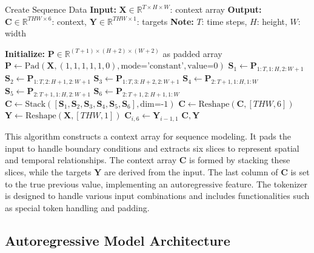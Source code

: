 \documentclass[10pt,a4paper]{article}
\begin{document}
\begin{algorithm}[ht]
\small  %
\caption{Create Sequence Data
\newline
\textbf{Input:} $\mathbf{X} \in \mathbb{R}^{T \times H \times W}$: context array
\newline
\textbf{Output:} $\mathbf{C} \in \mathbb{R}^{THW \times 6}$: context, $\mathbf{Y} \in \mathbb{R}^{THW \times 1}$: targets
\newline
\textbf{Note:} $T$: time steps, $H$: height, $W$: width
}
\begin{algorithmic}[0]
\State \textbf{Initialize:} $\mathbf{P} \in \mathbb{R}^{(T+1) \times (H+2) \times (W+2)}$ as padded array
    \State $\mathbf{P} \gets \text{Pad}(\mathbf{X}, (1,1,1,1,1,0), \text{mode='constant'}, \text{value=0})$
    \State $\mathbf{S}_1 \gets \mathbf{P}_{1:T, 1:H, 2:W+1}$
    \State $\mathbf{S}_2 \gets \mathbf{P}_{1:T, 2:H+1, 2:W+1}$
    \State $\mathbf{S}_3 \gets \mathbf{P}_{1:T, 3:H+2, 2:W+1}$
    \State $\mathbf{S}_4 \gets \mathbf{P}_{2:T+1, 1:H, 1:W}$
    \State $\mathbf{S}_5 \gets \mathbf{P}_{2:T+1, 1:H, 2:W+1}$
    \State $\mathbf{S}_6 \gets \mathbf{P}_{2:T+1, 2:H+1, 1:W}$
    \State $\mathbf{C} \gets \text{Stack}([\mathbf{S}_1, \mathbf{S}_2, \mathbf{S}_3, \mathbf{S}_4, \mathbf{S}_5, \mathbf{S}_6], \text{dim=-1})$
    \State $\mathbf{C} \gets \text{Reshape}(\mathbf{C}, [THW, 6])$
    \State $\mathbf{Y} \gets \text{Reshape}(\mathbf{X}, [THW, 1])$
        \State $\mathbf{C}_{i,6} \gets \mathbf{Y}_{i-1,1}$
    \EndFor
    \State \Return $\mathbf{C}, \mathbf{Y}$
\EndFunction
\end{algorithmic}
\end{algorithm}

This algorithm constructs a context array for sequence modeling. It pads the input to handle boundary conditions and extracts six slices to represent spatial and temporal relationships. The context array $\mathbf{C}$ is formed by stacking these slices, while the targets $\mathbf{Y}$ are derived from the input. The last column of $\mathbf{C}$ is set to the true previous value, implementing an autoregressive feature. The tokenizer is designed to handle various input combinations and includes functionalities such as special token handling and padding.

\subsection{Autoregressive Model Architecture}
\end{document}
